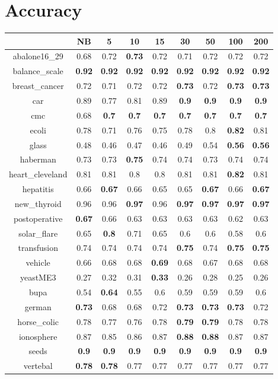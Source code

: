 \documentclass{article}%
\begin{document}
%
\normalsize%
\section*{Accuracy}%
\begin{tabular}{c|cccccccc}%
\hline%
&NB&5&10&15&30&50&100&200\\%
\hline%
abalone16\_29&0.68&0.72&\textbf{0.73}&0.72&0.71&0.72&0.72&0.72\\%
\hline%
balance\_scale&\textbf{0.92}&\textbf{0.92}&\textbf{0.92}&\textbf{0.92}&\textbf{0.92}&\textbf{0.92}&\textbf{0.92}&\textbf{0.92}\\%
\hline%
breast\_cancer&0.72&0.71&0.72&0.72&\textbf{0.73}&0.72&\textbf{0.73}&\textbf{0.73}\\%
\hline%
car&0.89&0.77&0.81&0.89&\textbf{0.9}&\textbf{0.9}&\textbf{0.9}&\textbf{0.9}\\%
\hline%
cmc&0.68&\textbf{0.7}&\textbf{0.7}&\textbf{0.7}&\textbf{0.7}&\textbf{0.7}&\textbf{0.7}&\textbf{0.7}\\%
\hline%
ecoli&0.78&0.71&0.76&0.75&0.78&0.8&\textbf{0.82}&0.81\\%
\hline%
glass&0.48&0.46&0.47&0.46&0.49&0.54&\textbf{0.56}&\textbf{0.56}\\%
\hline%
haberman&0.73&0.73&\textbf{0.75}&0.74&0.74&0.73&0.74&0.74\\%
\hline%
heart\_cleveland&0.81&0.81&0.8&0.8&0.81&0.81&\textbf{0.82}&0.81\\%
\hline%
hepatitis&0.66&\textbf{0.67}&0.66&0.65&0.65&\textbf{0.67}&0.66&\textbf{0.67}\\%
\hline%
new\_thyroid&0.96&0.96&\textbf{0.97}&0.96&\textbf{0.97}&\textbf{0.97}&\textbf{0.97}&\textbf{0.97}\\%
\hline%
postoperative&\textbf{0.67}&0.66&0.63&0.63&0.63&0.63&0.62&0.63\\%
\hline%
solar\_flare&0.65&\textbf{0.8}&0.71&0.65&0.6&0.6&0.58&0.6\\%
\hline%
transfusion&0.74&0.74&0.74&0.74&\textbf{0.75}&0.74&\textbf{0.75}&\textbf{0.75}\\%
\hline%
vehicle&0.66&0.68&0.68&\textbf{0.69}&0.68&0.67&0.68&0.68\\%
\hline%
yeastME3&0.27&0.32&0.31&\textbf{0.33}&0.26&0.28&0.25&0.26\\%
\hline%
bupa&0.54&\textbf{0.64}&0.55&0.6&0.59&0.59&0.59&0.6\\%
\hline%
german&\textbf{0.73}&0.68&0.68&0.72&\textbf{0.73}&\textbf{0.73}&\textbf{0.73}&0.72\\%
\hline%
horse\_colic&0.78&0.77&0.76&0.78&\textbf{0.79}&\textbf{0.79}&0.78&0.78\\%
\hline%
ionosphere&0.87&0.85&0.86&0.87&\textbf{0.88}&\textbf{0.88}&0.87&0.87\\%
\hline%
seeds&\textbf{0.9}&\textbf{0.9}&\textbf{0.9}&\textbf{0.9}&\textbf{0.9}&\textbf{0.9}&\textbf{0.9}&\textbf{0.9}\\%
\hline%
vertebal&\textbf{0.78}&\textbf{0.78}&0.77&0.77&0.77&0.77&0.77&0.77\\%
\hline%
\end{tabular}
\end{document}
